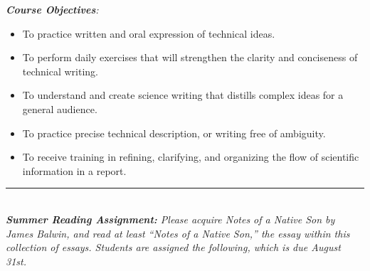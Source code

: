\documentclass[10pt]{article}
\begin{document}
\textit{\textbf{Course Objectives}:}
\begin{itemize}
\item To practice written and oral expression of technical ideas.
\item To perform daily exercises that will strengthen the clarity and conciseness of technical writing.
\item To understand and create science writing that distills complex ideas for a general audience.
\item To practice precise technical description, or writing free of ambiguity.
\item To receive training in refining, clarifying, and organizing the flow of scientific information in a report.
\end{itemize}
\noindent\rule{18cm}{0.4pt}\\
\textit{\textbf{Summer Reading Assignment:} Please acquire Notes of a Native Son by James Balwin, and read at least ``Notes of a Native Son,'' the essay within this collection of essays.  Students are assigned the following, which is due August 31st.}
\end{document}
